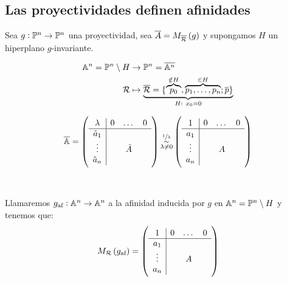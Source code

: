 \subsection{Las proyectividades definen afinidades}
Sea $g: \mathbb{P}^n \to \mathbb{P}^n$ una proyectividad, sea $\overline{A}=M_{\overline{\mathcal{R}}}\left( g\right)$ y supongamos $H$ un hiperplano $g$-invariante. \\
    \begin{minipage}[c]{0,44\textwidth}
        \begin{align*}
            \mathbb{A}^n = \mathbb{P}^n\setminus H &\to  \mathbb{P}^n = \overline{\mathbb{A}^n} \\
            \mathcal{R} &\mapsto  \underbrace{\overline{\mathcal{R}}= \{\overbrace{p_0}^{\notin H}, \overbrace{p_1,\dots, p_n}^{\in H};\overline{p}\}}_{H\text{: }x_0=0}
        \end{align*}
    \end{minipage}
    \vline
    \begin{minipage}[c]{0,56\textwidth}
        \begin{gather*}
            \overline{\mathbb{A}}=\left(
                \begin{array}{c|ccc}
                    \lambda & 0 & \dots & 0 \\ \hline
                    \tilde{a}_1 & & & \\
                    \vdots & & \tilde{A} & \\
                    \tilde{a}_n & & & 
                \end{array} \right) 
                \substack{\sfrac{1}{\lambda} \\ \sim \\ \lambda\neq0}
            \left(
                \begin{array}{c|ccc}
                    1 & 0 & \dots & 0 \\ \hline
                    a_1 & & & \\
                    \vdots & & A & \\
                    a_n & & & 
                \end{array} \right)
        \end{gather*}
    \end{minipage}\\
    \begin{defi}
        Llamaremos $g_\text{af} : \mathbb{A}^n \to \mathbb{A}^n$ a la afinidad inducida por $g$ en $\mathbb{A}^n = \mathbb{P}^n\setminus H$ y tenemos que:
        \begin{gather*}
            M_{\mathcal{R}} \left( g_\text{af}\right) =
            \left(
                \begin{array}{c|ccc}
                    1 & 0 & \dots & 0 \\ \hline
                    a_1 & & & \\
                    \vdots & & A & \\
                    a_n & & & 
                \end{array} \right)
        \end{gather*}
    \end{defi}

